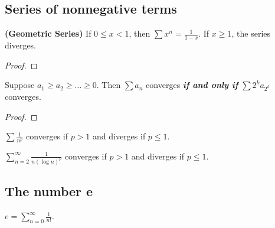 \subsection{Series of nonnegative terms}

\begin{theorem}
[pma 3.26]
\textbf{(Geometric Series)} If $0\leq x< 1$, then $\sum x^n=\frac{1}{1-x}$. If $x\geq 1$, the series diverges.
\end{theorem}
\begin{proof}

\end{proof}

\begin{theorem}
[pma 3.27]
Suppose $a_1\geq a_2\geq \dots \geq 0$. Then $\sum a_n$ converges \textbf{\emph{if and only if}} $\sum 2^ka_{2^k}$ converges.
\end{theorem}
\begin{proof}

\end{proof}

\begin{theorem}
[pma 3.28]
$\sum \frac{1}{n^p}$ converges if $p>1$ and diverges if $p\leq 1$.
\end{theorem}

\begin{theorem}
[pma 3.29]
$\sum\limits_{n=2}^{\infty}\frac{1}{n(\log n)^p}$ converges if $p>1$ and diverges if $p\leq 1$.
\end{theorem}

\subsection{The number e}
\begin{definition}
[pma 3.30]
$e=\sum\limits_{n=0}^\infty \frac{1}{n!}$.
\end{definition}

